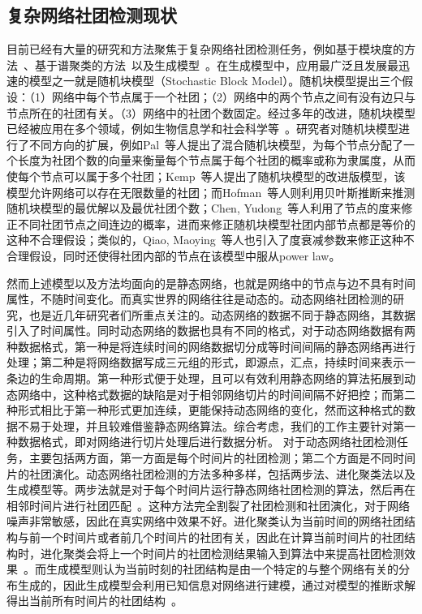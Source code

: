 \subsection{复杂网络社团检测现状}

目前已经有大量的研究和方法聚焦于复杂网络社团检测任务，例如基于模块度的方法~\cite{waltman2013smart}、基于谱聚类的方法~\cite{krzakala2013spectral}以及生成模型~\cite{holland1976local}。在生成模型中，应用最广泛且发展最迅速的模型之一就是随机块模型（Stochastic Block Model）。随机块模型提出三个假设：（1）网络中每个节点属于一个社团；（2）网络中的两个节点之间有没有边只与节点所在的社团有关。（3）网络中的社团个数固定。经过多年的改进，随机块模型已经被应用在多个领域，例如生物信息学和社会科学等~\cite{airoldi2006mixed,hoff2002latent}。研究者对随机块模型进行了不同方向的扩展，例如Pal~\cite{pal2019scalable}等人提出了混合随机块模型，为每个节点分配了一个长度为社团个数的向量来衡量每个节点属于每个社团的概率或称为隶属度，从而使每个节点可以属于多个社团；Kemp~\cite{kemp2004discovering}等人提出了随机块模型的改进版模型，该模型允许网络可以存在无限数量的社团；而Hofman~\cite{hofman2008bayesian}等人则利用贝叶斯推断来推测随机块模型的最优解以及最优社团个数；Chen, Yudong~\cite{chen2018convexified}等人利用了节点的度来修正不同社团节点之间连边的概率，进而来修正随机块模型社团内部节点都是等价的这种不合理假设；类似的，Qiao, Maoying~\cite{qiao2018adapting}等人也引入了度衰减参数来修正这种不合理假设，同时还使得社团内部的节点在该模型中服从power law。

然而上述模型以及方法均面向的是静态网络，也就是网络中的节点与边不具有时间属性，不随时间变化。而真实世界的网络往往是动态的。动态网络社团检测的研究，也是近几年研究者们所重点关注的。动态网络的数据不同于静态网络，其数据引入了时间属性。同时动态网络的数据也具有不同的格式，对于动态网络数据有两种数据格式，第一种是将连续时间的网络数据切分成等时间间隔的静态网络再进行处理；第二种是将网络数据写成三元组的形式，即{源点，汇点，持续时间}来表示一条边的生命周期。第一种形式便于处理，且可以有效利用静态网络的算法拓展到动态网络中，这种格式数据的缺陷是对于相邻网络切片的时间间隔不好把控；而第二种形式相比于第一种形式更加连续，更能保持动态网络的变化，然而这种格式的数据不易于处理，并且较难借鉴静态网络算法。综合考虑，我们的工作主要针对第一种数据格式，即对网络进行切片处理后进行数据分析。
对于动态网络社团检测任务，主要包括两方面，第一方面是每个时间片的社团检测；第二个方面是不同时间片的社团演化\cite{rossetti2018community,dakiche2019tracking}。动态网络社团检测的方法多种多样，包括两步法、进化聚类法以及生成模型等。两步法就是对于每个时间片运行静态网络社团检测的算法，然后再在相邻时间片进行社团匹配~\cite{tajeuna2015tracking}。这种方法完全割裂了社团检测和社团演化，对于网络噪声非常敏感，因此在真实网络中效果不好。进化聚类认为当前时间的网络社团结构与前一个时间片或者前几个时间片的社团有关，因此在计算当前时间片的社团结构时，进化聚类会将上一个时间片的社团检测结果输入到算法中来提高社团检测效果~\cite{jiang2019efficient}。而生成模型则认为当前时刻的社团结构是由一个特定的与整个网络有关的分布生成的，因此生成模型会利用已知信息对网络进行建模，通过对模型的推断求解得出当前所有时间片的社团结构~\cite{yang2011detecting}。

